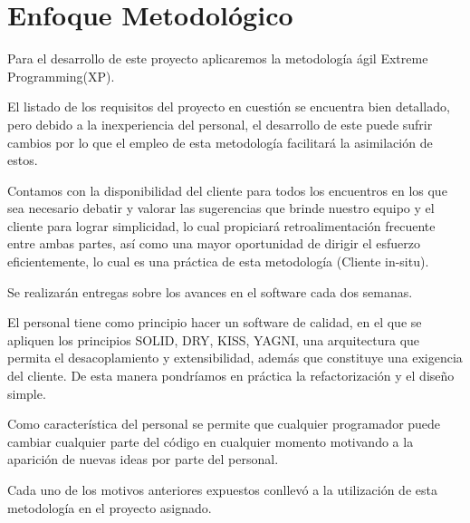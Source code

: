 \chapter{Enfoque Metodológico}

Para el desarrollo de este proyecto aplicaremos la metodología ágil Extreme Programming(XP).

El listado de los requisitos del proyecto en cuestión se encuentra bien detallado, pero debido a la inexperiencia del personal, el desarrollo de este puede sufrir cambios por lo que el empleo de esta metodología facilitará la asimilación de estos.

Contamos con la disponibilidad del cliente para todos los encuentros en los que sea necesario debatir y valorar las sugerencias que brinde nuestro equipo y el cliente para lograr simplicidad, lo cual propiciará retroalimentación frecuente entre ambas partes, así como una mayor oportunidad de dirigir el esfuerzo eficientemente, lo cual es una práctica de esta metodología (Cliente in-situ).

Se realizarán entregas sobre los avances en el software cada dos semanas.

El personal tiene como principio hacer un software de calidad, en el que se apliquen los principios SOLID, DRY, KISS, YAGNI, una arquitectura que permita el desacoplamiento y extensibilidad, además que constituye una exigencia del cliente. De esta manera pondríamos en práctica la refactorización y el diseño simple.

Como característica del personal se permite que cualquier programador puede cambiar cualquier parte del código en cualquier momento motivando a la aparición de nuevas ideas por parte del personal.

Cada uno de los motivos anteriores expuestos conllevó a la utilización de esta metodología en el proyecto asignado.